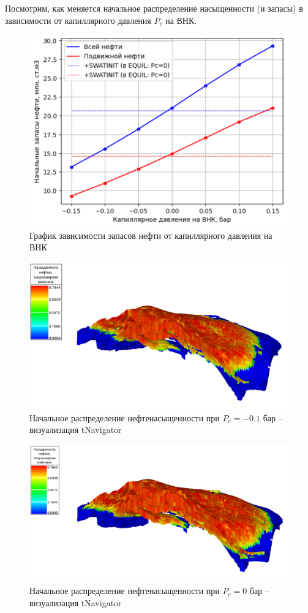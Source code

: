 \documentclass[a4paper,12pt]{article}
\begin{document}
Посмотрим, как меняется начальное распределение насыщенности (и запасы) в зависимости от капиллярного давления $P_c$ на ВНК.

\begin{figure}[H]
\center
\includegraphics[width=.8\textwidth]{initial_reserves_plot}
\caption{График зависимости запасов нефти от капиллярного давления на ВНК}
\label{fig:initial_reserves_plot}
\end{figure}

\begin{figure}[H]
\center
\includegraphics[width=\textwidth]{saturation_1_model_1}
\caption{Начальное распределение нефтенасыщенности при $P_c=-0.1$ бар -- визуализация tNavigator}
\label{fig:saturation_1_model_1}
\end{figure}

\begin{figure}[H]
\center
\includegraphics[width=\textwidth]{saturation_2_model_1}
\caption{Начальное распределение нефтенасыщенности при $P_c=0$ бар -- визуализация tNavigator}
\label{fig:saturation_2_model_1}
\end{figure}
\end{document}
